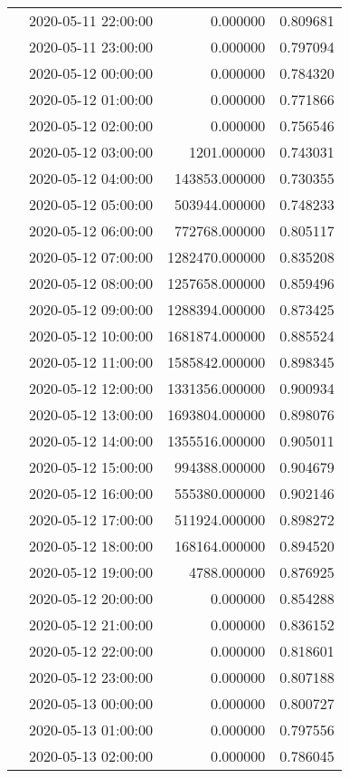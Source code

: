 \begin{tabular}{llrr}
 & 2020-05-11 22:00:00 & 0.000000 & 0.809681 \\
 & 2020-05-11 23:00:00 & 0.000000 & 0.797094 \\
 & 2020-05-12 00:00:00 & 0.000000 & 0.784320 \\
 & 2020-05-12 01:00:00 & 0.000000 & 0.771866 \\
 & 2020-05-12 02:00:00 & 0.000000 & 0.756546 \\
 & 2020-05-12 03:00:00 & 1201.000000 & 0.743031 \\
 & 2020-05-12 04:00:00 & 143853.000000 & 0.730355 \\
 & 2020-05-12 05:00:00 & 503944.000000 & 0.748233 \\
 & 2020-05-12 06:00:00 & 772768.000000 & 0.805117 \\
 & 2020-05-12 07:00:00 & 1282470.000000 & 0.835208 \\
 & 2020-05-12 08:00:00 & 1257658.000000 & 0.859496 \\
 & 2020-05-12 09:00:00 & 1288394.000000 & 0.873425 \\
 & 2020-05-12 10:00:00 & 1681874.000000 & 0.885524 \\
 & 2020-05-12 11:00:00 & 1585842.000000 & 0.898345 \\
 & 2020-05-12 12:00:00 & 1331356.000000 & 0.900934 \\
 & 2020-05-12 13:00:00 & 1693804.000000 & 0.898076 \\
 & 2020-05-12 14:00:00 & 1355516.000000 & 0.905011 \\
 & 2020-05-12 15:00:00 & 994388.000000 & 0.904679 \\
 & 2020-05-12 16:00:00 & 555380.000000 & 0.902146 \\
 & 2020-05-12 17:00:00 & 511924.000000 & 0.898272 \\
 & 2020-05-12 18:00:00 & 168164.000000 & 0.894520 \\
 & 2020-05-12 19:00:00 & 4788.000000 & 0.876925 \\
 & 2020-05-12 20:00:00 & 0.000000 & 0.854288 \\
 & 2020-05-12 21:00:00 & 0.000000 & 0.836152 \\
 & 2020-05-12 22:00:00 & 0.000000 & 0.818601 \\
 & 2020-05-12 23:00:00 & 0.000000 & 0.807188 \\
 & 2020-05-13 00:00:00 & 0.000000 & 0.800727 \\
 & 2020-05-13 01:00:00 & 0.000000 & 0.797556 \\
 & 2020-05-13 02:00:00 & 0.000000 & 0.786045 \\

\end{tabular}

